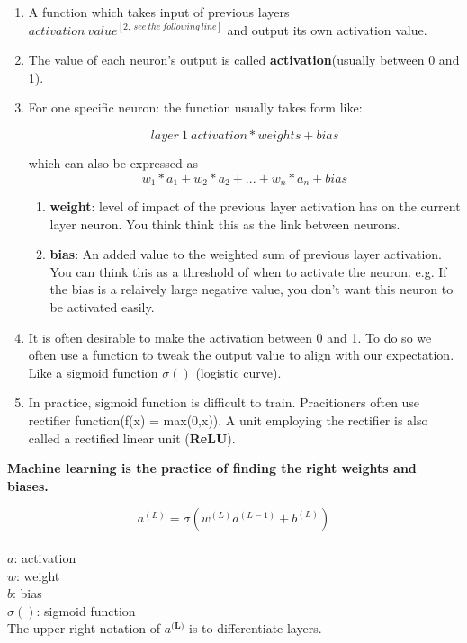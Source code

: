 \documentclass{article}
\begin{document}
\begin{enumerate}
    \item A function which takes input of previous layers $activation\ value^{[2,\ see\ the\ following\ line]}$ and output its own activation value.
    \item The value of each neuron's output is called \textbf{activation}(usually between 0 and 1).
    \item For one specific neuron: the function usually takes form like:
  
        $$layer\ 1\ activation * weights + bias$$

        which can also be expressed as $$w_1*a_1 + w_2*a_2 + ... + w_n*a_n + bias$$
    
        \begin{enumerate}
            \item \textbf{weight}: level of impact of the previous layer activation has on the current layer neuron. You think think this as the link between neurons.
            \item \textbf{bias}: An added value to the weighted sum of previous layer activation. You can think this as a threshold of when to activate the neuron. e.g. If the bias is a relaively large negative value, you don't want this neuron to be activated easily.
        
        \end{enumerate}

    \item It is often desirable to make the activation between 0 and 1. To do so we often use a function to tweak the output value to align with our expectation. Like a sigmoid function $\sigma()$ (logistic curve).
  
    \item In practice, sigmoid function is difficult to train. Pracitioners often use rectifier function(f(x) = max(0,x)). A unit employing the rectifier is also called a rectified linear unit (\textbf{ReLU}).
  
\end{enumerate}

    \textbf{Machine learning is the practice of finding the right weights and biases.}

        $$a^{(L)} = \sigma(w^{(L)}a^{(L-1)}+b^{(L)})$$ \\
        \indent $a$: activation \\
        \indent $w$: weight \\
        \indent $b$: bias \\
        \indent $\sigma()$: sigmoid function \\
        \indent The upper right notation of $a^{\textbf{(L)}}$ is to differentiate layers.
 
\end{document}
